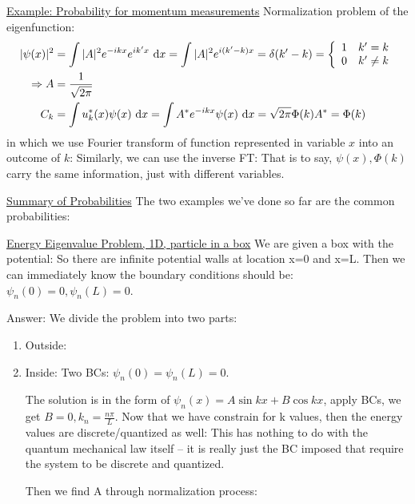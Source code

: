 \documentclass{school-22.101-notes}
\begin{document}
\uline{Example: Probability for momentum measurements}
Normalization problem of the eigenfunction:
\begin{align}
|\psi (x)|^2 &= \int |A|^2 e^{-ikx} e^{ik^{\prime}x} \mbox{ }\mathrm{d} x = \int |A|^2 e^{i(k^{\prime}-k)x} = \delta(k^{\prime} - k) = \left\{ \begin{array}{cc}  1 & k^{\prime} = k  \\ 0 &  k^{\prime} \neq k   \end{array} \right. \\
\Rightarrow A &= \frac{1}{\sqrt{2 \pi}}  \\
 C_k &= \int  u_k^*(x) \psi(x) \mbox{ }\mathrm{d} x = \int  A^* e^{-ikx} \psi(x) \mbox{ }\mathrm{d} x = \sqrt{2 \pi} \Phi(k) A^* = \Phi(k)
\end{align}
in which we use Fourier transform of function represented in variable $x$ into an outcome of $k$:
Similarly, we can use the inverse FT:
That is to say, $\psi(x), \Phi(k)$ carry the same information, just with different variables. 


\uline{Summary of Probabilities}
The two examples we've done so far are the common probabilities:

\uline{Energy Eigenvalue Problem, 1D, particle in a box}
We are given a box with the potential:
So there are infinite potential walls at location x=0 and x=L. Then we can immediately know the boundary conditions should be: $\psi_n (0) = 0, \psi_n(L) = 0$. 

Answer: We divide the problem into two parts:
\begin{enumerate}
\item Outside: 
\item Inside: 
Two BCs: $\psi_n (0) = \psi_n(L) =0$. 

The solution is in the form of $\psi_n (x) = A \sin kx + B \cos kx$, apply BCs, we get $B=0, k_n = \frac{n \pi}{L} $. Now that we have constrain for k values, then the energy values are discrete/quantized as well: 
This has nothing to do with the quantum mechanical law itself -- it is really just the BC imposed that require the system to be discrete and quantized. 

Then we find A through normalization process:

\end{enumerate}
\end{document}
